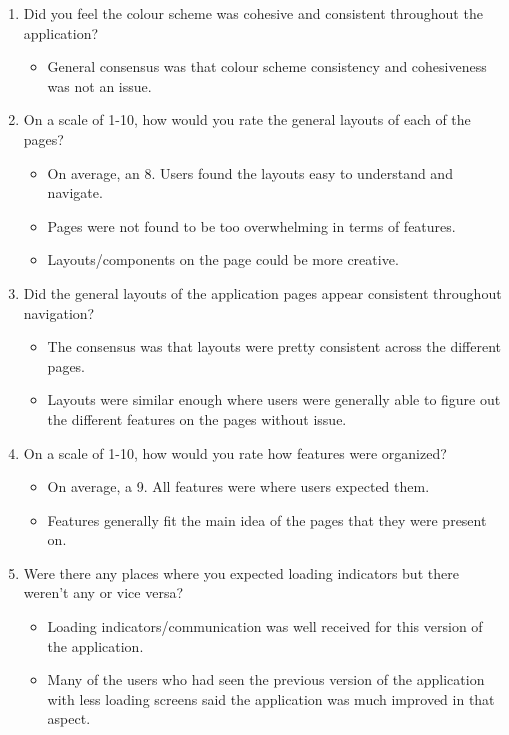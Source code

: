 \documentclass[12pt, titlepage]{article}
\begin{document}
\begin{enumerate}
  \item Did you feel the colour scheme was cohesive and consistent throughout the application?
    \begin{itemize}
      \item General consensus was that colour scheme consistency and cohesiveness was not an issue.
    \end{itemize}
  \item On a scale of 1-10, how would you rate the general layouts of each of the pages?
    \begin{itemize}
      \item On average, an 8. Users found the layouts easy to understand and navigate.
      \item Pages were not found to be too overwhelming in terms of features.
      \item Layouts/components on the page could be more creative.
    \end{itemize}
  \item Did the general layouts of the application pages appear consistent throughout navigation?
    \begin{itemize}
      \item The consensus was that layouts were pretty consistent across the different pages.
      \item Layouts were similar enough where users were generally able to figure out the different
      features on the pages without issue.
    \end{itemize}
  \item On a scale of 1-10, how would you rate how features were organized?
    \begin{itemize}
      \item On average, a 9. All features were where users expected them.
      \item Features generally fit the main idea of the pages that they were present on.
    \end{itemize}
  \item Were there any places where you expected loading indicators but there weren't any or vice versa?
    \begin{itemize}
      \item Loading indicators/communication was well received for this version of the application.
      \item Many of the users who had seen the previous version of the application with less loading screens
      said the application was much improved in that aspect.

\end{itemize}
\end{enumerate}
\end{document}
